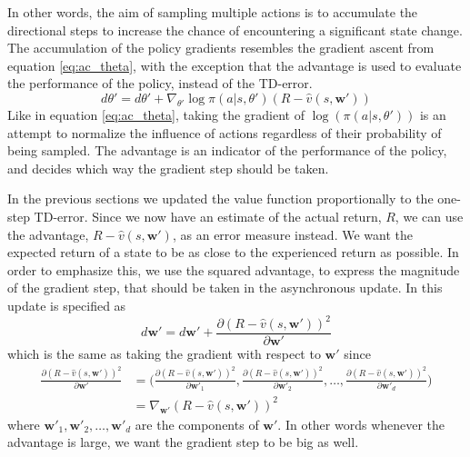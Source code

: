 \documentclass[11pt]{article}
\begin{document}
In other words, the aim of sampling multiple actions is to accumulate the directional steps
to increase the chance of encountering a significant state change.
The accumulation of the policy gradients resembles the gradient ascent from equation
\ref{eq:ac_theta}, with the exception that the advantage is used to evaluate
the performance of the policy, instead of the TD-error.
\begin{equation}
    d\theta' = d\theta' + \nabla_{\theta'} \log \pi(a|s, \theta')(R - \hat{v}(s, \mathbf{w}'))
\end{equation}
Like in equation \ref{eq:ac_theta}, taking the gradient of $\log(\pi(a|s, \theta'))$
is an attempt to normalize the influence of actions regardless of their probability
of being sampled.
The advantage is an indicator of the performance of the policy, and decides
which way the gradient step should be taken.

In the previous sections we updated the value function proportionally to the
one-step TD-error.
Since we now have an estimate of the actual return, $R$, we can use the advantage, $R - \hat{v}(s, \mathbf{w'})$,
as an error measure instead.
We want the expected return of a state to be as close to the experienced return as possible.
In order to emphasize this, we use the squared advantage, to express the magnitude of the
gradient step, that should be taken in the asynchronous update.
In \cite{a3c} this update is specified as
\begin{equation}
    d\mathbf{w}' = d\mathbf{w}' + \frac{\partial (R - \hat{v}(s, \mathbf{w'}))^2}{\partial \mathbf{w}'}
\end{equation}
which is the same as taking the gradient with respect to $\mathbf{w}'$ since
\begin{equation*}
    \begin{aligned}
        \frac{\partial (R - \hat{v}(s, \mathbf{w}'))^2}{\partial \mathbf{w}'} & = \bigg(
            \frac{\partial (R - \hat{v}(s, \mathbf{w}'))^2}{\partial \mathbf{w}'_1},
            \frac{\partial (R - \hat{v}(s, \mathbf{w}'))^2}{\partial \mathbf{w}'_2}, \dots,
            \frac{\partial (R - \hat{v}(s, \mathbf{w}'))^2}{\partial \mathbf{w}'_d} \bigg) \\
            & = \nabla_{\mathbf{w}'} (R - \hat{v}(s, \mathbf{w}'))^2
    \end{aligned}
\end{equation*}
where $\mathbf{w}'_1, \mathbf{w}'_2, \dots, \mathbf{w}'_d$ are the components of $\mathbf{w}'$.
In other words whenever the advantage is large, we want the gradient step to be big as well.
\end{document}
